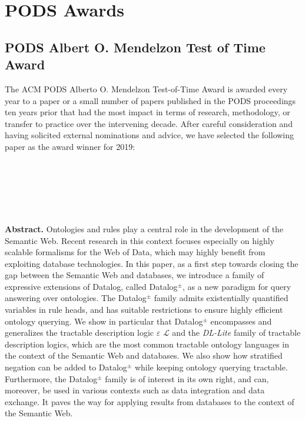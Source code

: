 \clearpage

\section{PODS Awards}

\subsection*{PODS Albert O. Mendelzon Test of Time Award}


The ACM PODS Alberto O. Mendelzon Test-of-Time Award is awarded every year to a paper or a small number of papers published in the PODS proceedings ten years prior that had the most impact in terms of research, methodology, or transfer to practice over the intervening decade. After careful consideration and having solicited external nominations and advice, we have selected the following paper as the award winner for 2019:


~\\~


~\\~

\textbf{Abstract.} Ontologies and rules play a central role in the development of the Semantic Web. Recent research in this context focuses especially on highly scalable formalisms for the Web of Data, which may highly benefit from exploiting database technologies. In this paper, as a first step towards closing the gap between the Semantic Web and databases, we introduce a family of expressive extensions of Datalog, called Datalog$^\pm$, as a new paradigm for query answering over ontologies. The Datalog$^\pm$ family admits existentially quantified variables in rule heads, and has suitable restrictions to ensure highly efficient ontology querying. We show in particular that Datalog$^\pm$ encompasses and generalizes the tractable description logic $\varepsilon$ $\mathscr{L}$ and the \emph{DL-Lite} family of tractable description logics, which are the most common tractable ontology languages in the context of the Semantic Web and databases. We also show how stratified negation can be added to Datalog$^\pm$ while keeping ontology querying tractable. Furthermore, the Datalog$^\pm$ family is of interest in its own right, and can, moreover, be used in various contexts such as data integration and data exchange. It paves the way for applying results from databases to the context of the Semantic Web.

